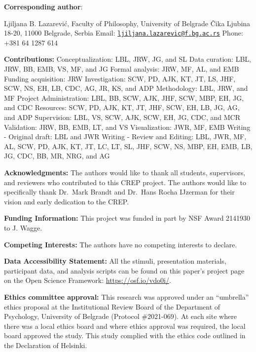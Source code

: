 \documentclass[
]{article}
\begin{document}
\newpage

\textbf{Corresponding author}:

Ljiljana B. Lazarević, Faculty of Philosophy, University of Belgrade
Čika Ljubina 18-20, 11000 Belgrade, Serbia Email:
\href{mailto:ljiljana.lazarevic@f.bg.ac.rs}{\nolinkurl{ljiljana.lazarevic@f.bg.ac.rs}}
Phone: +381 64 1287 614

\textbf{Contributions:} Conceptualization: LBL, JRW, JG, and SL Data
curation: LBL, JRW, BB, EMB, VS, MF, and JG Formal analysis: JRW, MF,
AL, and EMB Funding acquisition: JRW Investigation: SCW, PD, AJK, KT,
JT, LS, JHF, SCW, NS, EH, LB, CDC, AG, JR, KS, and ADP Methodology: LBL,
JRW, and MF Project Administration: LBL, BB, SCW, AJK, JHF, SCW, MBP,
EH, JG, and CDC Resources: SCW, PD, AJK, KT, JT, JHF, SCW, EH, LB, JG,
AG, and ADP Supervision: LBL, VS, SCW, AJK, SCW, EH, JG, CDC, and MCR
Validation: JRW, BB, EMB, LT, and VS Visualization: JWR, MF, EMB Writing
- Original draft: LBL and JWR Writing - Review and Editing: LBL, JWR,
MF, AL, SCW, PD, AJK, KT, JT, LC, LT, SL, JHF, SCW, NS, MBP, EH, EMB,
LB, JG, CDC, BB, MR, NRG, and AG

\textbf{Acknowledgments:} The authors would like to thank all students,
supervisors, and reviewers who contributed to this CREP project. The
authors would like to specifically thank Dr.~Mark Brandt and Dr.~Hans
Rocha IJzerman for their vision and early dedication to the CREP.

\textbf{Funding Information:} This project was funded in part by NSF
Award 2141930 to J. Wagge.

\textbf{Competing Interests:} The authors have no competing interests to
declare.

\textbf{Data Accessibility Statement:} All the stimuli, presentation
materials, participant data, and analysis scripts can be found on this
paper's project page on the Open Science Framework:
\url{https://osf.io/vdo0i/}.

\textbf{Ethics committee approval:} This research was approved under an
``umbrella'' ethics proposal at the Institutional Review Board of the
Department of Psychology, University of Belgrade (Protocol \#2021-069).
At each site where there was a local ethics board and where ethics
approval was required, the local board approved the study. This study
complied with the ethics code outlined in the Declaration of Helsinki.
\end{document}
